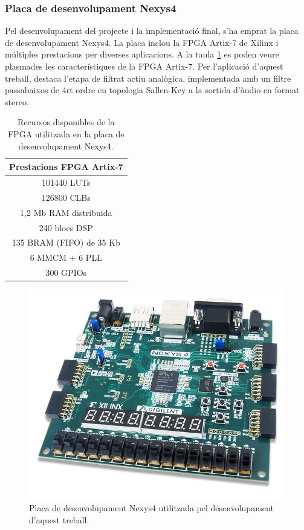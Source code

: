 \subsubsection{Placa de desenvolupament Nexys4}
\par Pel desenvolupament del projecte i la implementació final, s'ha emprat la placa de desenvolupament Nexys4. La placa inclou la FPGA Artix-7 de Xilinx i múltiples prestacions per diverses aplicacions. A la taula \ref{taulaArtix7} es poden veure plasmades les característiques de la FPGA Artix-7. Per l'aplicació d'aquest treball, destaca l'etapa de filtrat actiu analògica, implementada amb un filtre passabaixos de 4rt ordre en topologia Sallen-Key a la sortida d'àudio en format stereo.
\begin{table}[H]
    \centering
    \begin{tabular}{ | c | }
    \hline
    \textbf{Prestacions FPGA Artix{-}7} \\ [2ex]
    \hline
    101440 LUTs \\ 
    \hline
    126800 CLBs \\ 
    \hline
    1,2 Mb RAM distribuida \\ 
    \hline
    240 blocs DSP \\ 
    \hline
    135 BRAM (FIFO) de 35 Kb \\ 
    \hline
    6 MMCM + 6 PLL \\ 
    \hline
    300 GPIOs \\ 
    \hline 
    \end{tabular}
    \caption{Recursos disponibles de la FPGA utilitzada en la placa de desenvolupament Nexys4.\cite{NEXYS4Dig}}
    \label{taulaArtix7}
\end{table}

\begin{figure}[H]
    \centering
    \includegraphics[width=0.3\linewidth]{Images/nexys-4.png}
    \caption{Placa de desenvolupament Nexys4 utilitzada pel desenvolupament d'aquest treball.\cite{NEXYS4Dig}}
    \label{figNEXYS4}
\end{figure}